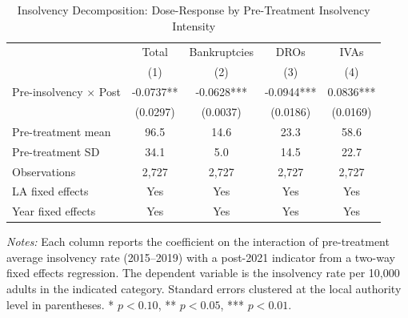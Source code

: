 \begin{table}[htbp]
\centering
\caption{Insolvency Decomposition: Dose-Response by Pre-Treatment Insolvency Intensity}
\label{tab:decomposition}
\begin{tabular}{lcccc}
\hline\hline
 & Total & Bankruptcies & DROs & IVAs \\
 & (1) & (2) & (3) & (4) \\
\hline
Pre-insolvency $\times$ Post & -0.0737** & -0.0628*** & -0.0944*** & 0.0836*** \\
 & (0.0297) & (0.0037) & (0.0186) & (0.0169) \\
\addlinespace
Pre-treatment mean & 96.5 & 14.6 & 23.3 & 58.6 \\
Pre-treatment SD & 34.1 & 5.0 & 14.5 & 22.7 \\
Observations & 2,727 & 2,727 & 2,727 & 2,727 \\
LA fixed effects & Yes & Yes & Yes & Yes \\
Year fixed effects & Yes & Yes & Yes & Yes \\
\hline\hline
\end{tabular}
\begin{tablenotes}
\item \textit{Notes:} Each column reports the coefficient on the interaction of pre-treatment average insolvency rate (2015--2019) with a post-2021 indicator from a two-way fixed effects regression. The dependent variable is the insolvency rate per 10,000 adults in the indicated category. Standard errors clustered at the local authority level in parentheses. * $p<0.10$, ** $p<0.05$, *** $p<0.01$.
\end{tablenotes}
\end{table}

